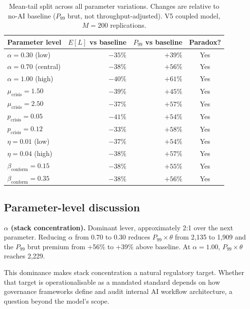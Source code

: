 \documentclass[11pt,a4paper]{article}
\begin{document}
\begin{appendices}
\begin{table}[H]
\centering\small
\setlength{\tabcolsep}{8pt}
\renewcommand{\arraystretch}{1.20}
\begin{tabular}{@{}l r r c@{}}
\toprule
\textbf{Parameter level} &
\textbf{$E[L]$ vs baseline} &
\textbf{$P_{99}$ vs baseline} &
\textbf{Paradox?} \\
\midrule
$\alpha = 0.30$ (low)           & $-35\%$ & $+39\%$ & Yes \\
$\alpha = 0.70$ (central)       & $-38\%$ & $+56\%$ & Yes \\
$\alpha = 1.00$ (high)          & $-40\%$ & $+61\%$ & Yes \\
\addlinespace
$\mu_{\text{crisis}} = 1.50$    & $-39\%$ & $+45\%$ & Yes \\
$\mu_{\text{crisis}} = 2.50$    & $-37\%$ & $+57\%$ & Yes \\
\addlinespace
$p_{\text{crisis}} = 0.05$      & $-41\%$ & $+54\%$ & Yes \\
$p_{\text{crisis}} = 0.12$      & $-33\%$ & $+58\%$ & Yes \\
\addlinespace
$\eta = 0.01$ (low)             & $-37\%$ & $+54\%$ & Yes \\
$\eta = 0.04$ (high)            & $-38\%$ & $+57\%$ & Yes \\
\addlinespace
$\beta_{\text{conform}} = 0.15$ & $-38\%$ & $+55\%$ & Yes \\
$\beta_{\text{conform}} = 0.35$ & $-38\%$ & $+56\%$ & Yes \\
\bottomrule
\end{tabular}
\caption{Mean-tail split across all parameter variations. Changes are
relative to no-AI baseline ($P_{99}$ brut, not throughput-adjusted). V5
coupled model, $M = 200$ replications.}
\label{tab:robustness}
\end{table}

\subsection{Parameter-level discussion}\label{app:sens:narrative}

\textbf{$\alpha$ (stack concentration).}
Dominant lever, approximately 2:1 over the next parameter. Reducing $\alpha$
from 0.70 to 0.30 reduces $P_{99}\times\theta$ from 2,135 to 1,909 and
the $P_{99}$ brut premium from +56\% to +39\% above baseline. At
$\alpha = 1.00$, $P_{99}\times\theta$ reaches 2,229.

This dominance makes stack concentration a natural regulatory target.
Whether that target is operationalisable as a mandated standard depends on
how governance frameworks define and audit internal AI workflow
architecture, a question beyond the model's scope.


\end{appendices}
\end{document}
